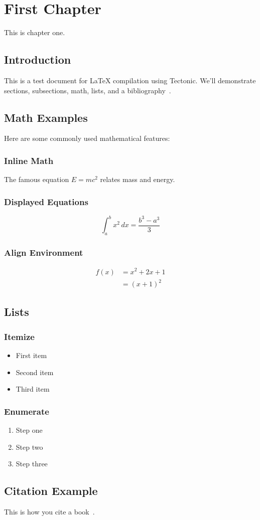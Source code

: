 \chapter{First Chapter}
This is chapter one.

\section{Introduction}
This is a test document for \LaTeX{} compilation using Tectonic. We'll demonstrate sections, subsections, math, lists, and a bibliography~\cite{knuth1984texbook}.

\section{Math Examples}
Here are some commonly used mathematical features:

\subsection{Inline Math}
The famous equation $E=mc^2$ relates mass and energy.

\subsection{Displayed Equations}
\begin{equation}
    \int_{a}^{b} x^2 \, dx = \frac{b^3 - a^3}{3}
\end{equation}

\subsection{Align Environment}
\begin{align}
    f(x) &= x^2 + 2x + 1 \\
         &= (x+1)^2
\end{align}

\section{Lists}

\subsection{Itemize}
\begin{itemize}
    \item First item
    \item Second item
    \item Third item
\end{itemize}

\subsection{Enumerate}
\begin{enumerate}
    \item Step one
    \item Step two
    \item Step three
\end{enumerate}

\section{Citation Example}
This is how you cite a book~\cite{knuth1984texbook}.
